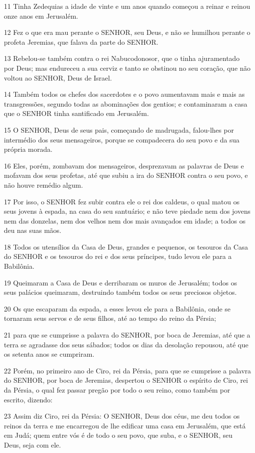\par 11 Tinha Zedequias a idade de vinte e um anos quando começou a reinar e reinou onze anos em Jerusalém.
\par 12 Fez o que era mau perante o SENHOR, seu Deus, e não se humilhou perante o profeta Jeremias, que falava da parte do SENHOR.
\par 13 Rebelou-se também contra o rei Nabucodonosor, que o tinha ajuramentado por Deus; mas endureceu a sua cerviz e tanto se obstinou no seu coração, que não voltou ao SENHOR, Deus de Israel.
\par 14 Também todos os chefes dos sacerdotes e o povo aumentavam mais e mais as transgressões, segundo todas as abominações dos gentios; e contaminaram a casa que o SENHOR tinha santificado em Jerusalém.
\par 15 O SENHOR, Deus de seus pais, começando de madrugada, falou-lhes por intermédio dos seus mensageiros, porque se compadecera do seu povo e da sua própria morada.
\par 16 Eles, porém, zombavam dos mensageiros, desprezavam as palavras de Deus e mofavam dos seus profetas, até que subiu a ira do SENHOR contra o seu povo, e não houve remédio algum.
\par 17 Por isso, o SENHOR fez subir contra ele o rei dos caldeus, o qual matou os seus jovens à espada, na casa do seu santuário; e não teve piedade nem dos jovens nem das donzelas, nem dos velhos nem dos mais avançados em idade; a todos os deu nas suas mãos.
\par 18 Todos os utensílios da Casa de Deus, grandes e pequenos, os tesouros da Casa do SENHOR e os tesouros do rei e dos seus príncipes, tudo levou ele para a Babilônia.
\par 19 Queimaram a Casa de Deus e derribaram os muros de Jerusalém; todos os seus palácios queimaram, destruindo também todos os seus preciosos objetos.
\par 20 Os que escaparam da espada, a esses levou ele para a Babilônia, onde se tornaram seus servos e de seus filhos, até ao tempo do reino da Pérsia;
\par 21 para que se cumprisse a palavra do SENHOR, por boca de Jeremias, até que a terra se agradasse dos seus sábados; todos os dias da desolação repousou, até que os setenta anos se cumpriram.
\par 22 Porém, no primeiro ano de Ciro, rei da Pérsia, para que se cumprisse a palavra do SENHOR, por boca de Jeremias, despertou o SENHOR o espírito de Ciro, rei da Pérsia, o qual fez passar pregão por todo o seu reino, como também por escrito, dizendo:
\par 23 Assim diz Ciro, rei da Pérsia: O SENHOR, Deus dos céus, me deu todos os reinos da terra e me encarregou de lhe edificar uma casa em Jerusalém, que está em Judá; quem entre vós é de todo o seu povo, que suba, e o SENHOR, seu Deus, seja com ele.


